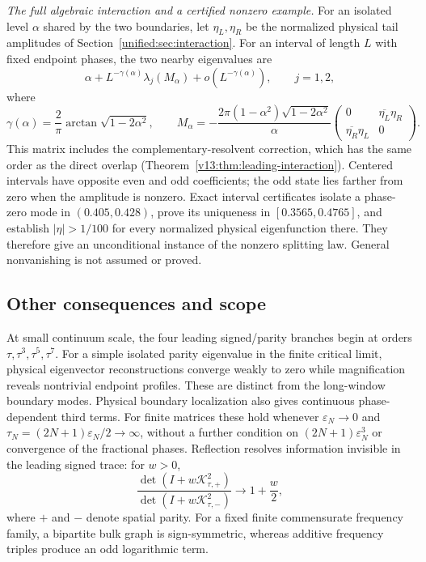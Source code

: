 \emph{The full algebraic interaction and a certified nonzero example.}
For an isolated level $\alpha$ shared by the two boundaries, let
$\eta_L,\eta_R$ be the normalized physical tail amplitudes of
Section~\ref{unified:sec:interaction}. For an interval of length $L$
with fixed endpoint phases, the two nearby eigenvalues are
\[
 \alpha+L^{-\gamma(\alpha)}\lambda_j(M_\alpha)
       +o(L^{-\gamma(\alpha)}),\qquad j=1,2,
\]
where
\[
 \gamma(\alpha)=\frac2\pi\arctan\sqrt{1-2\alpha^2},\qquad
 M_\alpha=-\frac{2\pi(1-\alpha^2)\sqrt{1-2\alpha^2}}{\alpha}
 \begin{pmatrix}0&\overline{\eta_L}\eta_R\\
                 \overline{\eta_R}\eta_L&0\end{pmatrix}.
\]
This matrix includes the complementary-resolvent correction, which
has the same order as the direct overlap
(Theorem~\ref{v13:thm:leading-interaction}). Centered intervals have
opposite even and odd coefficients; the odd state lies farther from
zero when the amplitude is nonzero. Exact interval certificates
isolate a phase-zero mode in $(0.405,0.428)$, prove its uniqueness in
$[0.3565,0.4765]$, and establish $|\eta|>1/100$ for every normalized
physical eigenfunction there. They therefore give an unconditional
instance of the nonzero splitting law. General nonvanishing is not
assumed or proved.

\subsection*{Other consequences and scope}
At small continuum scale, the four leading signed/parity branches begin
at orders $\tau,\tau^3,\tau^5,\tau^7$. For a simple isolated parity
eigenvalue in the finite critical limit, physical eigenvector
reconstructions converge weakly to zero while magnification reveals
nontrivial endpoint profiles. These are distinct from the long-window
boundary modes.
Physical boundary localization also gives continuous phase-dependent third terms.
For finite matrices these hold whenever $\varepsilon_N\to0$ and
$\tau_N=(2N+1)\varepsilon_N/2\to\infty$, without a further condition
on $(2N+1)\varepsilon_N^3$ or convergence of the fractional phases.
Reflection resolves information invisible in the leading signed trace:
for $w>0$,
\[
 \frac{\det(I+w\mathcal K_{\tau,+}^2)}
      {\det(I+w\mathcal K_{\tau,-}^2)}\longrightarrow1+\frac w2,
\]
where $+$ and $-$ denote spatial parity. For a fixed finite
commensurate frequency family, a bipartite bulk graph is sign-symmetric,
whereas additive frequency triples produce an odd logarithmic term.

